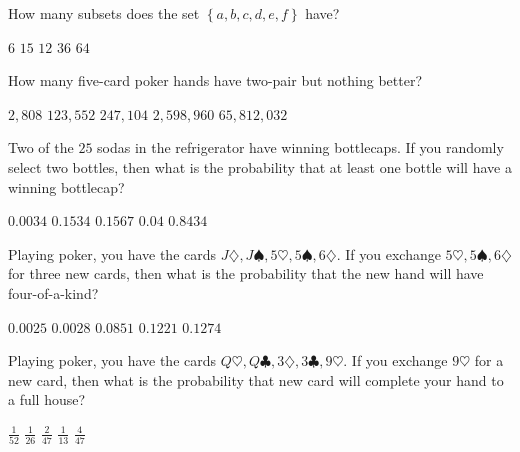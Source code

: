 \documentclass[answers,12pt]{exam}
\begin{document}
\begin{questions}
\question How many subsets does the set
$\left\{a,b,c,d,e,f\right\}$ have?\\
\begin{oneparchoices}
\choice $6$ %
\choice $15$ %
\choice $12$ %
\choice $36$ %
\correctchoice $64$
\end{oneparchoices}

\question 
How many five-card poker hands have two-pair but nothing better?\\
\begin{oneparchoices}
\choice $2,808$ %
\correctchoice $123,552$
\choice $247,104$ %
\choice $2,598,960$ %
\choice $65,812,032$ %
\end{oneparchoices}

\question Two of the $25$ sodas in the refrigerator
have winning bottlecaps. If you randomly select two
bottles, then what is the probability that at least one bottle
will have a winning bottlecap?\\
\begin{oneparchoices}
\choice $0.0034$ %
\choice $0.1534$ %
\correctchoice $0.1567$
\choice $0.04$ %
\choice $0.8434$ %
\end{oneparchoices}

\question Playing poker, you have the cards
$J\diamondsuit,J\spadesuit,5\heartsuit,5\spadesuit,6\diamondsuit$.
If you exchange $5\heartsuit,5\spadesuit,6\diamondsuit$ for three
new cards, then what is the probability that the new hand
will have four-of-a-kind?\\
\begin{oneparchoices}
\choice $0.0025$ %
\correctchoice $0.0028$
\choice $0.0851$ %
\choice $0.1221$ %
\choice $0.1274$ %
\end{oneparchoices}

\question Playing poker, you have the cards
$Q\heartsuit,Q\clubsuit,3\diamondsuit,3\clubsuit,9\heartsuit$.
If you exchange $9\heartsuit$ for a new card,
then what is the probability that new card
will complete your hand to a full house?\\
\begin{oneparchoices}
\choice $\frac{1}{52}$
\choice $\frac{1}{26}$ %
\choice $\frac{2}{47}$ %
\choice $\frac{1}{13}$ %
\correctchoice $\frac{4}{47}$
\end{oneparchoices}

\end{questions}
\end{document}
